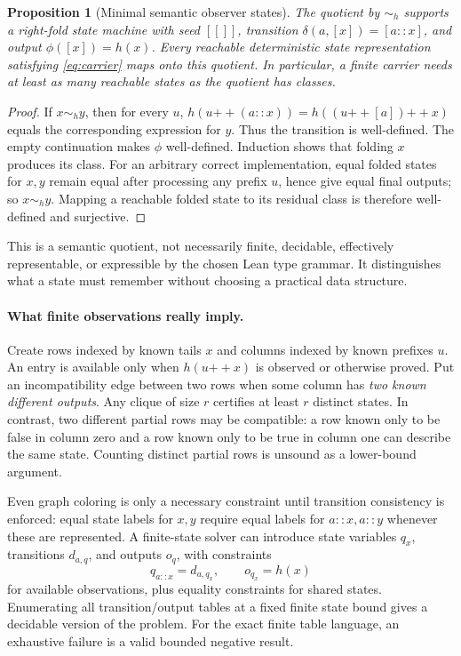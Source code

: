 \documentclass[11pt,a4paper]{article}
\newtheorem{proposition}{Proposition}[section]
\theoremstyle{definition}
\theoremstyle{remark}
\newcommand{\concat}{\mathbin{+\!+}}
\begin{document}
\begin{proposition}[Minimal semantic observer states]\label{prop:residual}
The quotient by $\sim_h$ supports a right-fold state machine with seed $[[]]$,
transition $\delta(a,[x])=[a::x]$, and output $\phi([x])=h(x)$. Every reachable
deterministic state representation satisfying \eqref{eq:carrier} maps onto
this quotient. In particular, a finite carrier needs at least as many reachable
states as the quotient has classes.
\end{proposition}
\begin{proof}
If $x\sim_h y$, then for every $u$,
$h(u\concat(a::x))=h((u\concat[a])\concat x)$ equals the corresponding expression
for $y$. Thus the transition is well-defined. The empty continuation makes
$\phi$ well-defined. Induction shows that folding $x$ produces its class.
For an arbitrary correct implementation, equal folded states for $x,y$ remain
equal after processing any prefix $u$, hence give equal final outputs; so
$x\sim_h y$. Mapping a reachable folded state to its residual class is
therefore well-defined and surjective.
\end{proof}

This is a semantic quotient, not necessarily finite, decidable, effectively
representable, or expressible by the chosen Lean type grammar. It distinguishes
what a state must remember without choosing a practical data structure.

\paragraph{What finite observations really imply.}
Create rows indexed by known tails $x$ and columns indexed by known prefixes
$u$. An entry is available only when $h(u\concat x)$ is observed or otherwise
proved. Put an incompatibility edge between two rows when some column has
\emph{two known different outputs}. Any clique of size $r$ certifies at least
$r$ distinct states. In contrast, two different partial rows may be compatible:
a row known only to be false in column zero and a row known only to be true in
column one can describe the same state. Counting distinct partial rows is
unsound as a lower-bound argument.

Even graph coloring is only a necessary constraint until transition
consistency is enforced: equal state labels for $x,y$ require equal labels for
$a::x,a::y$ whenever these are represented. A finite-state solver can introduce
state variables $q_x$, transitions $d_{a,q}$, and outputs $o_q$, with constraints
\[
 q_{a::x}=d_{a,q_x},\qquad o_{q_x}=h(x)
\]
for available observations, plus equality constraints for shared states.
Enumerating all transition/output tables at a fixed finite state bound gives
a decidable version of the problem. For the exact finite table language, an
exhaustive failure is a valid bounded negative result.
\end{document}
